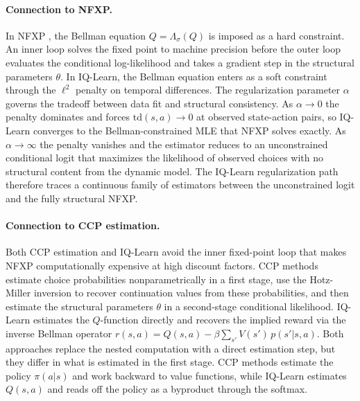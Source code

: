 \paragraph{Connection to NFXP.}
In NFXP \citep{rust1987,iskhakov2016}, the Bellman equation $Q = \Lambda_\sigma(Q)$ is imposed as a hard constraint. An inner loop solves the fixed point to machine precision before the outer loop evaluates the conditional log-likelihood and takes a gradient step in the structural parameters $\theta$. In IQ-Learn, the Bellman equation enters as a soft constraint through the $\ell^2$ penalty on temporal differences. The regularization parameter $\alpha$ governs the tradeoff between data fit and structural consistency. As $\alpha \to 0$ the penalty dominates and forces $\mathrm{td}(s,a) \to 0$ at observed state-action pairs, so IQ-Learn converges to the Bellman-constrained MLE that NFXP solves exactly. As $\alpha \to \infty$ the penalty vanishes and the estimator reduces to an unconstrained conditional logit that maximizes the likelihood of observed choices with no structural content from the dynamic model. The IQ-Learn regularization path therefore traces a continuous family of estimators between the unconstrained logit and the fully structural NFXP.

\paragraph{Connection to CCP estimation.}
Both CCP estimation \citep{hotzMiller1993,aguirregabiriaMira2002} and IQ-Learn avoid the inner fixed-point loop that makes NFXP computationally expensive at high discount factors. CCP methods estimate choice probabilities nonparametrically in a first stage, use the Hotz-Miller inversion to recover continuation values from these probabilities, and then estimate the structural parameters $\theta$ in a second-stage conditional likelihood. IQ-Learn estimates the $Q$-function directly and recovers the implied reward via the inverse Bellman operator $r(s,a) = Q(s,a) - \beta\sum_{s'}V(s')\,p(s'|s,a)$. Both approaches replace the nested computation with a direct estimation step, but they differ in what is estimated in the first stage. CCP methods estimate the policy $\pi(a|s)$ and work backward to value functions, while IQ-Learn estimates $Q(s,a)$ and reads off the policy as a byproduct through the softmax.

